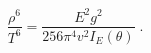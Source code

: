 \begin{equation}
\label{3-19}
\frac{\rho^6}{T^6} = \frac{E^2 g^2}{256 \pi^4 v^2 I_E(\theta)}\;.
\end{equation}

